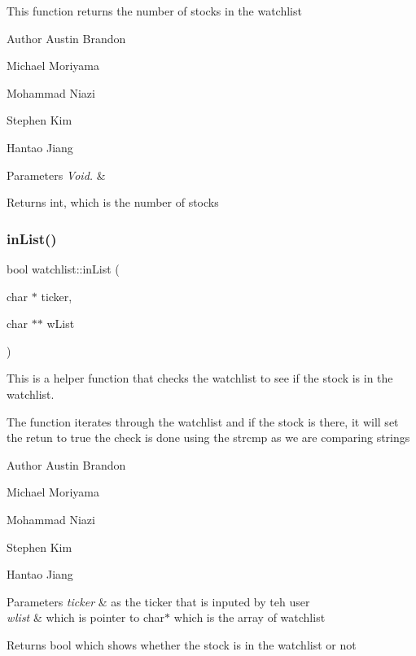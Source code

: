 This function returns the number of stocks in the watchlist

\begin{DoxyAuthor}{Author}
Austin Brandon 

Michael Moriyama 

Mohammad Niazi 

Stephen Kim 

Hantao Jiang 
\end{DoxyAuthor}

\begin{DoxyParams}{Parameters}
{\em Void.} & \\
\hline
\end{DoxyParams}
\begin{DoxyReturn}{Returns}
int, which is the number of stocks 
\end{DoxyReturn}
\mbox{\label{classwatchlist_a2ddba00bedd1e566b6ae416875cf1910}} 
\subsubsection{\texorpdfstring{in\+List()}{inList()}}
{\footnotesize\ttfamily bool watchlist\+::in\+List (\begin{DoxyParamCaption}\item[{char $\ast$}]{ticker,  }\item[{char $\ast$$\ast$}]{w\+List }\end{DoxyParamCaption})}



This is a helper function that checks the watchlist to see if the stock is in the watchlist. 

The function iterates through the watchlist and if the stock is there, it will set the retun to true the check is done using the strcmp as we are comparing strings

\begin{DoxyAuthor}{Author}
Austin Brandon 

Michael Moriyama 

Mohammad Niazi 

Stephen Kim 

Hantao Jiang 
\end{DoxyAuthor}

\begin{DoxyParams}{Parameters}
{\em ticker} & as the ticker that is inputed by teh user \\
\hline
{\em wlist} & which is pointer to char$\ast$ which is the array of watchlist \\
\hline
\end{DoxyParams}
\begin{DoxyReturn}{Returns}
bool which shows whether the stock is in the watchlist or not 
\end{DoxyReturn}
\mbox{\label{classwatchlist_a95423fb8cdc057441ae85b01eb8a4a9d}} 
